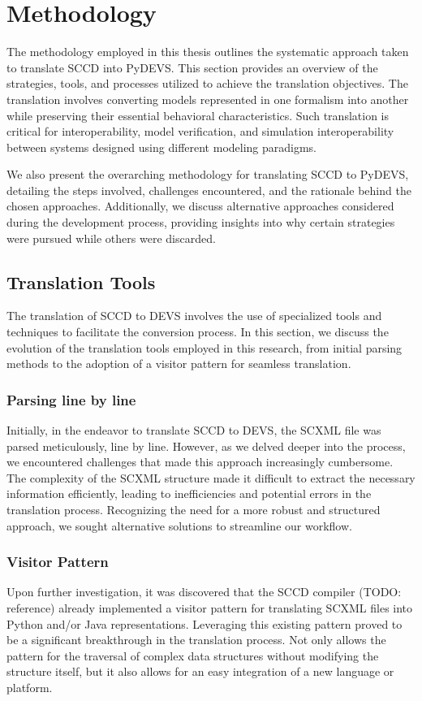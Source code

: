 \chapter{Methodology}
\label{chapt:Methodology}
The methodology employed in this thesis outlines the systematic approach taken to translate SCCD into PyDEVS. This section provides an overview of the strategies, tools, and processes utilized to achieve the translation objectives. 
The translation involves converting models represented in one formalism into another while preserving their essential behavioral characteristics. Such translation is critical for interoperability, model verification, and simulation 
interoperability between systems designed using different modeling paradigms.

We also present the overarching methodology for translating SCCD to PyDEVS, detailing the steps involved, challenges encountered, and the rationale behind the chosen approaches. Additionally, we discuss alternative 
approaches considered during the development process, providing insights into why certain strategies were pursued while others were discarded.

\section{Translation Tools}

The translation of SCCD to DEVS involves the use of specialized tools and techniques to facilitate the conversion process. In this section, we discuss the evolution of the translation tools employed in this research, from initial 
parsing methods to the adoption of a visitor pattern for seamless translation.

\subsection{Parsing line by line}
Initially, in the endeavor to translate SCCD to DEVS, the SCXML file was parsed meticulously, line by line. However, as we delved deeper into the process, we encountered challenges that made this approach increasingly cumbersome. 
The complexity of the SCXML structure made it difficult to extract the necessary information efficiently, leading to inefficiencies and potential errors in the translation process. Recognizing the need for a more robust and 
structured approach, we sought alternative solutions to streamline our workflow.

\subsection{Visitor Pattern}
Upon further investigation, it was discovered that the SCCD compiler (TODO: reference) already implemented a visitor pattern for translating SCXML files into Python and/or Java representations. Leveraging this existing pattern 
proved to be a significant breakthrough in the translation process. Not only allows the pattern for the traversal of complex data structures without modifying the structure itself, but it also allows for an easy integration of 
a new language or platform. 

